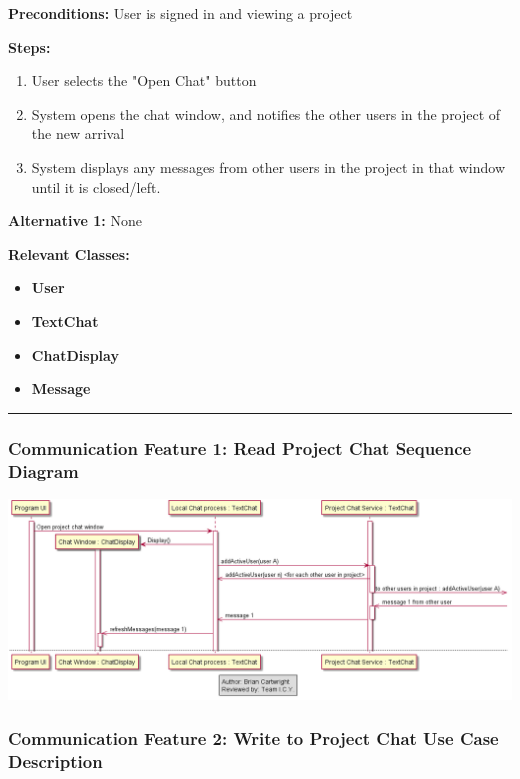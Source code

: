 \documentclass[twoside,letterpaper]{article}
\begin{document}
\noindent\textbf{Preconditions:} User is signed in and viewing a project \newline

\noindent\textbf{Steps:} \begin{enumerate}
	\item User selects the "Open Chat" button
	\item System opens the chat window, and notifies the other users in the project of the new arrival
	\item System displays any messages from other users in the project in that window until it is closed/left.
\end{enumerate}
\noindent\textbf{Alternative 1:} None \newline


\noindent\textbf{Relevant Classes:}
\begin{itemize}
	\item \textbf{User}
	\item \textbf{TextChat}
	\item \textbf{ChatDisplay}
	\item \textbf{Message}
\end{itemize}
\hrule
\newpage

\subsubsection[Communication Feature 1: Read Project Chat Sequence Diagram]{\rmfamily\bfseries\color{black}
	Communication Feature 1: Read Project Chat Sequence Diagram}
\hypertarget{RefHeading22059017292}{}

\bigskip

\includegraphics[width=\textwidth]{images/SequenceDiagrams/Comms_OpenRead}

\newpage

\subsubsection[Communication Feature 2: Write to Project Chat Use Case Description]{\rmfamily\bfseries\color{black}
	Communication Feature 2: Write to Project Chat Use Case Description}
\hypertarget{RefHeading22059017292}{}
\end{document}
